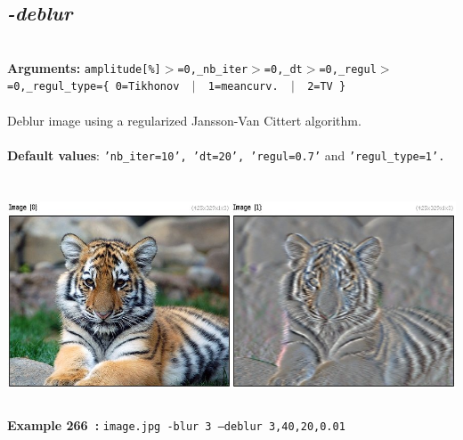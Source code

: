 \documentclass[a4paper,11pt,twoside]{book}
\begin{document}
\subsection{\emph{-deblur} }\vspace*{-0.5em}
~\\\textbf{Arguments: } 
{\small \texttt{amplitude[\%]$>$=0,\_nb\_iter$>$=0,\_dt$>$=0,\_regul$>$=0,\_regul\_type=\{ 0=Tikhonov ~$|$~ 1=meancurv. ~$|$~ 2=TV \}}}\\~\\
Deblur image using a regularized Jansson-Van Cittert algorithm.
~\\~\\\textbf{Default values}: {\small \texttt{'nb\_iter=10', 'dt=20', 'regul=0.7'} and \texttt{'regul\_type=1'.}}
\begin{center}\includegraphics[keepaspectratio=true,height=7cm,width=\textwidth]{img/gmic_def266.jpg}\\
{\footnotesize \textbf{Example 266~:} \texttt{image.jpg -blur 3 --deblur 3,40,20,0.01}}
\end{center}
\end{document}
